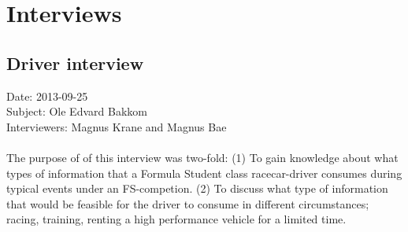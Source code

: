 \chapter{Interviews}
\clearpage

\section*{Driver interview}
\label{interview:bakkom}
Date: 2013-09-25\\
Subject: Ole Edvard Bakkom\\
Interviewers: Magnus Krane and Magnus Bae\\
\\
The purpose of of this interview was two-fold: (1) To gain knowledge about what types
of information that a Formula Student class racecar-driver consumes during typical events 
under an FS-competion. (2) To discuss what type of information that would be feasible for the driver
to consume in different circumstances; racing, training, renting a high performance vehicle for a limited time.


